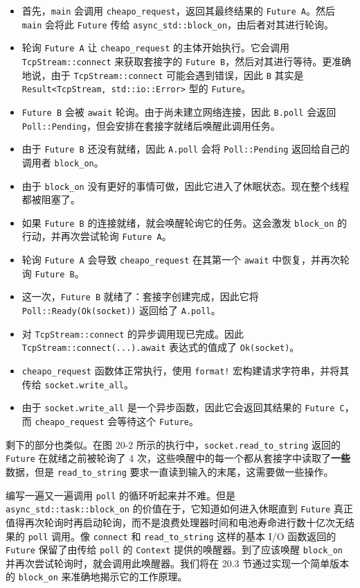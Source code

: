 \begin{itemize}
\item 首先，\texttt{main} 会调用 \texttt{cheapo\_request}，返回其最终结果的 \texttt{Future A}。然后 \texttt{main} 会将此 \texttt{Future} 传给 \texttt{async\_std::block\_on}，由后者对其进行轮询。
\item 轮询 \texttt{Future A} 让 \texttt{cheapo\_request} 的主体开始执行。它会调用 \texttt{TcpStream::connect} 来获取套接字的 \texttt{Future B}，然后对其进行等待。更准确地说，由于 \texttt{TcpStream::connect} 可能会遇到错误，因此 \texttt{B} 其实是 \texttt{Result<TcpStream, std::io::Error>} 型的 \texttt{Future}。
\item \texttt{Future B} 会被 \texttt{await} 轮询。由于尚未建立网络连接，因此 \texttt{B.poll} 会返回 \texttt{Poll::Pending}，但会安排在套接字就绪后唤醒此调用任务。
\item 由于 \texttt{Future B} 还没有就绪，因此 \texttt{A.poll} 会将 \texttt{Poll::Pending} 返回给自己的调用者 \texttt{block\_on}。
\item 由于 \texttt{block\_on} 没有更好的事情可做，因此它进入了休眠状态。现在整个线程都被阻塞了。
\item 如果 \texttt{Future B} 的连接就绪，就会唤醒轮询它的任务。这会激发 \texttt{block\_on} 的行动，并再次尝试轮询 \texttt{Future A}。
\item 轮询 \texttt{Future A} 会导致 \texttt{cheapo\_request} 在其第一个 \texttt{await} 中恢复，并再次轮询 \texttt{Future B}。
\item 这一次，\texttt{Future B} 就绪了：套接字创建完成，因此它将 \texttt{Poll::Ready(Ok(socket))} 返回给了 \texttt{A.poll}。
\item 对 \texttt{TcpStream::connect} 的异步调用现已完成。因此 \texttt{TcpStream::connect(...).await} 表达式的值成了 \texttt{Ok(socket)}。
\item \texttt{cheapo\_request} 函数体正常执行，使用 \texttt{format!} 宏构建请求字符串，并将其传给 \texttt{socket.write\_all}。
\item 由于 \texttt{socket.write\_all} 是一个异步函数，因此它会返回其结果的 \texttt{Future C}，而 \texttt{cheapo\_request} 会等待这个 \texttt{Future}。
\end{itemize}

剩下的部分也类似。在图 20-2 所示的执行中，\texttt{socket.read\_to\_string} 返回的 \texttt{Future} 在就绪之前被轮询了 4 次，这些唤醒中的每一个都从套接字中读取了\textbf{一些}数据，但是 \texttt{read\_to\_string} 要求一直读到输入的末尾，这需要做一些操作。

编写一遍又一遍调用 \texttt{poll} 的循环听起来并不难。但是 \texttt{async\_std::task::block\_on} 的价值在于，它知道如何进入休眠直到 \texttt{Future} 真正值得再次轮询时再启动轮询，而不是浪费处理器时间和电池寿命进行数十亿次无结果的 \texttt{poll} 调用。像 \texttt{connect} 和 \texttt{read\_to\_string} 这样的基本 I/O 函数返回的 \texttt{Future} 保留了由传给 \texttt{poll} 的 \texttt{Context} 提供的唤醒器。到了应该唤醒 \texttt{block\_on} 并再次尝试轮询时，就会调用此唤醒器。我们将在 20.3 节通过实现一个简单版本的 \texttt{block\_on} 来准确地揭示它的工作原理。

